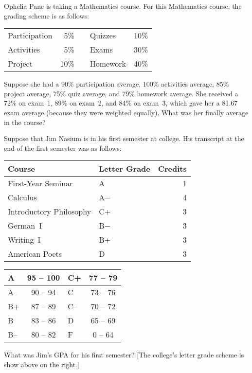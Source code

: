 \documentclass[11pt,letterpaper]{article}
\begin{document}
 Ophelia Pane is taking a Mathematics course. For this Mathematics course, the grading scheme is as follows:
	\begin{table}[!ht]
	\centering
	\begin{tabular}{lrclr}
	Participation & 5\% & \hspace{1.5cm} & Quizzes & 10\% \\
	Activities & 5\% & & Exams & 30\% \\
	Project & 10\% & & Homework & 40\%
	\end{tabular}
	\end{table} \par
Suppose she had a 90\% participation average, 100\% activities average, 85\% project average, 75\% quiz average, and 79\% homework average. She received a 72\% on exam~1, 89\% on exam~2, and 84\% on exam~3, which gave her a 81.67 exam average (because they were weighted equally). What was her finally average in the course?



\newpage



 Suppose that Jim Nasium is in his first semester at college. His transcript at the end of the first semester was as follows: \par
	\begin{table}[!ht]
	\centering
	\begin{tabular}{llr}
	Course & Letter Grade & Credits \\ \hline
	First-Year Seminar & A & 1 \\
	Calculus & A$-$ & 4 \\
	Introductory Philosophy & C+ & 3 \\
	German~I & B$-$ & 3 \\
	Writing~I & B+ & 3 \\
	American Poets & D & 3
	\end{tabular} \hspace{1cm}
        \begin{tabular}{|l||c|l||c|} \hline
        A & 95 -- 100 & C+ & 77 -- 79 \\ \hline
        A-- & 90 -- 94 & C & 73 -- 76 \\ \hline
        B+ & 87 -- 89 & C-- & 70 -- 72 \\ \hline
        B & 83 -- 86 & D & 65 -- 69 \\ \hline
        B-- & 80 -- 82 & F & 0 -- 64 \\ \hline
        \end{tabular}
	\end{table} \par
What was Jim's GPA for his first semester? [The college's letter grade scheme is show above on the right.]
\end{document}
